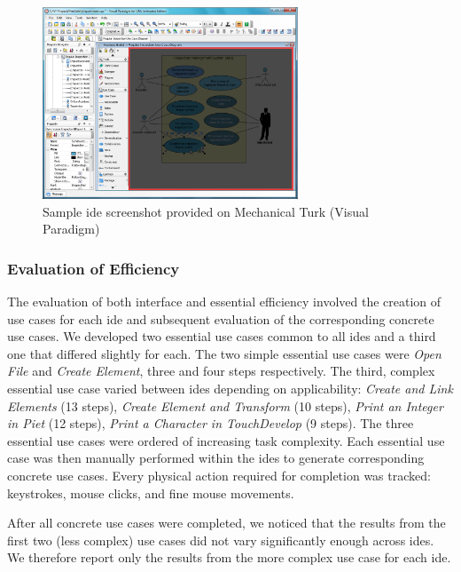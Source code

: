 \begin{figure}[!t]
\centering
\includegraphics[width=3in]{images/clutter_shot}
\caption{Sample \ac{ide} screenshot provided on Mechanical Turk (Visual
Paradigm)}
\label{fig:clutterexample}
\end{figure}


\subsubsection{Evaluation of Efficiency} \label{subsubsec:efficiency}

The evaluation of both interface and essential efficiency involved the
creation of use cases for each \ac{ide} and subsequent evaluation of the
corresponding concrete use cases. We developed two essential use cases
common to all \acp{ide} and a third one that differed slightly for each.
The two simple essential use cases were \emph{Open File} and \emph{Create
Element}, three and four steps respectively. The third, complex essential
use case varied between \acp{ide} depending on applicability: \emph{Create
and Link Elements} (13 steps), \emph{Create Element and Transform}
(10 steps), \emph{Print an Integer in Piet} (12 steps), \emph{Print a
Character in TouchDevelop} (9 steps). The three essential use cases were
ordered of increasing task complexity.
Each essential use case was then manually performed within the \acp{ide} to generate corresponding concrete use cases.
Every physical action required for completion was tracked: keystrokes, mouse clicks, and fine mouse movements.

After all concrete use cases were completed, we noticed that the results from the first two (less complex) use cases did not vary significantly enough across \acp{ide}.
We therefore report only the results from the more complex use case for each \ac{ide}.

